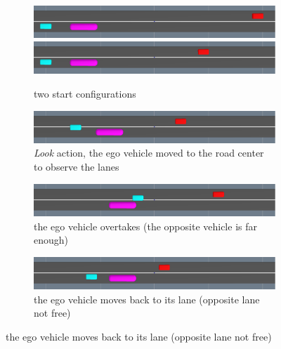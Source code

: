 \documentclass[conference]{IEEEtran}
\begin{document}
\begin{figure}[h!]
  \centering
  \begin{subfigure}[t]{0.5\textwidth}
      \includegraphics[width=\textwidth]{data/cars/start-0.png}
      \includegraphics[width=\textwidth]{data/cars/start-1.png}
      \caption{two start configurations}
      \label{fig:overtaking-start-configurations}
  \end{subfigure}   
      
  \begin{subfigure}[t]{0.5\textwidth}
      \includegraphics[width=\textwidth]{data/cars/look.png}
        \caption{\textit{Look} action, the ego vehicle moved to the road center to observe the lanes}
          \label{fig:overtaking-look}
  \end{subfigure} 
  \begin{subfigure}[t]{0.5\textwidth}
      \includegraphics[width=\textwidth]{data/cars/overtaking.png}
        \caption{the ego vehicle overtakes (the opposite vehicle is far enough)}
  \end{subfigure}
  \begin{subfigure}[t]{0.5\textwidth}
      \includegraphics[width=\textwidth]{data/cars/follow.png}
      \caption{the ego vehicle moves back to its lane (opposite lane not free)}
  \end{subfigure}
  \label{fig:overtaking-configurations}
\end{figure}
\end{document}
